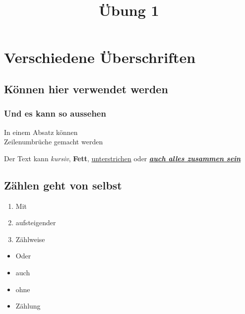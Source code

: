 \documentclass[11pt, a4paper]{article}
\title{Übung 1}
\date{}
\begin{document}
\maketitle
\tableofcontents

\section{Verschiedene Überschriften}
\subsection{Können hier verwendet werden}
\subsubsection{Und es kann so aussehen}

In einem Absatz können \\ Zeilenumbrüche gemacht werden

\noindent Der Text kann \textit{kursiv}, \textbf{Fett}, \underline{unterstrichen}
 oder \textbf{\textit{\underline{auch alles zusammen sein}}}
 
\subsection{Zählen geht von selbst}

\begin{enumerate}
\item Mit
\item aufsteigender
\item Zählweise
\end{enumerate}

\begin{itemize}
\item Oder
\item auch
\item ohne
\item Zählung
\end{itemize}
 
\end{document}
